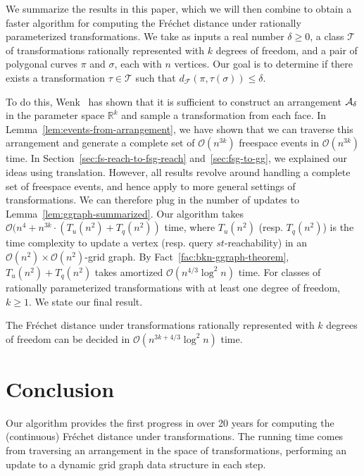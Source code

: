 \documentclass[thm-restate]{lipics-v2021}
\theoremstyle{remark}
\newcommand{\Oh}{\mathcal{O}}
\newcommand{\df}[1]{d_{\mathcal{F}}(#1)}
\newcommand{\reals}[0]{\mathbb{R}}
\newcommand{\trans}[0]{\mathcal{T}}
\begin{document}
We summarize the results in this paper, which we will then combine to obtain a faster algorithm for computing the Fr\'echet distance under rationally parameterized transformations. We take as inputs a real number $\delta \geq 0$, a class $\trans$ of transformations rationally represented with $k$ degrees of freedom, and a pair of polygonal curves $\pi$ and $\sigma$, each with $n$ vertices. Our goal is to determine if there exists a transformation $\tau \in \trans$ such that $\df{\pi, \tau(\sigma)} \leq \delta$. 

To do this, Wenk~\cite{wenkShapeMatchingHigher2003} has shown that it is sufficient to construct an arrangement $\mathcal{A_\delta}$ in the parameter space $\reals^k$ and sample a transformation from each face. In Lemma~\ref{lem:events-from-arrangement}, we have shown that we can traverse this arrangement and generate a complete set of $\Oh(n^{3k})$ freespace events in $\Oh(n^{3k})$ time. In Section~\ref{sec:fs-reach-to-fsg-reach} and~\ref{sec:fsg-to-gg}, we explained our ideas using translation. However, all results revolve around handling a complete set of freespace events, and hence apply to more general settings of transformations. We can therefore plug in the number of updates to Lemma~\ref{lem:ggraph-summarized}. Our algorithm takes $\Oh(n^4 + n^{3k} \cdot (T_u(n^2) + T_q(n^2))$ time, where $T_u(n^2)$ (resp. $T_q(n^2)$) is the time complexity to update a vertex (resp. query $st$-reachability) in an $\Oh(n^2) \times \Oh(n^2)$-grid graph. By Fact~\ref{fac:bkn-ggraph-theorem}, $T_u(n^2) + T_q(n^2)$ takes amortized $\Oh(n^{4/3} \log^2 n)$ time. For classes of rationally parameterized transformations with at least one degree of freedom, $k \geq 1$. 
We state our final result.
\begin{theorem}
    The Fréchet distance under transformations rationally represented with $k$ degrees of freedom can be decided in $\Oh(n^{3k + 4/3} \log^2 n)$ time. 
\end{theorem}

\section{Conclusion}

Our algorithm provides the first progress in over 20 years for computing the (continuous) Fr\'echet distance under transformations. The running time comes from traversing an arrangement in the space of transformations, performing an update to a dynamic grid graph data structure in each step. 
\end{document}

